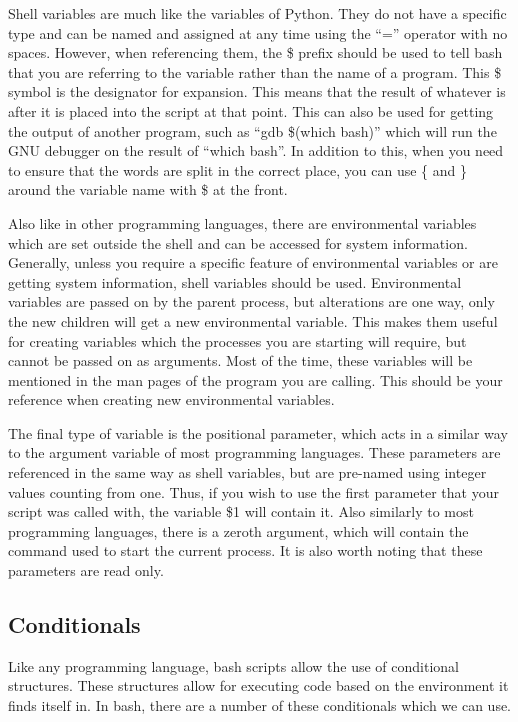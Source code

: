 			Shell variables are much like the variables of Python. 
			They do not have a specific type and can be named and assigned at any time using the ``='' operator with no spaces.
			However, when referencing them, the \$ prefix should be used to tell bash that you are referring to the variable rather than the name of a program.
			This \$ symbol is the designator for expansion. 
			This means that the result of whatever is after it is placed into the script at that point. 
			This can also be used for getting the output of another program, such as ``gdb \$(which bash)'' which will run the GNU debugger on the result of ``which bash''. 
			In addition to this, when you need to ensure that the words are split in the correct place, you can use \{ and \} around the variable name with \$ at the front. 

			Also like in other programming languages, there are environmental variables which are set outside the shell and can be accessed for system information. 
			Generally, unless you require a specific feature of environmental variables or are getting system information, shell variables should be used. 
			Environmental variables are passed on by the parent process, but alterations are one way, only the new children will get a new environmental variable. 
			This makes them useful for creating variables which the processes you are starting will require, but cannot be passed on as arguments. 
			Most of the time, these variables will be mentioned in the man pages of the program you are calling. 
			This should be your reference when creating new environmental variables. 

			The final type of variable is the positional parameter, which acts in a similar way to the argument variable of most programming languages. 
			These parameters are referenced in the same way as shell variables, but are pre-named using integer values counting from one. 
			Thus, if you wish to use the first parameter that your script was called with, the variable \$1 will contain it. 
			Also similarly to most programming languages, there is a zeroth argument, which will contain the command used to start the current process. 
			It is also worth noting that these parameters are read only. 


		\subsection{Conditionals}
			Like any programming language, bash scripts allow the use of conditional structures. 
			These structures allow for executing code based on the environment it finds itself in. 
			In bash, there are a number of these conditionals which we can use. 

